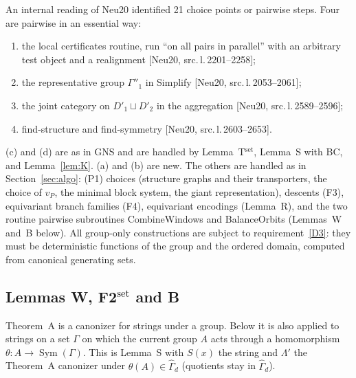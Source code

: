 \documentclass[11pt]{article}
\newenvironment{enumlab}[2][]{\begin{enumerate}\renewcommand{\theenumi}{#1#2{enumi}}%
  \renewcommand{\labelenumi}{(\theenumi)}}{\end{enumerate}}
\theoremstyle{plain}
\theoremstyle{definition}
\theoremstyle{remark}
\theoremstyle{named}
\theoremstyle{namedrm}
\newcommand{\Sym}{\operatorname{Sym}}
\newcommand{\Gd}{\widehat{\Gamma}_d}
\newcommand{\src}[2]{[#1, src.\,l.\,#2]}
\begin{document}
An internal reading of Neu20 identified 21 choice points or pairwise steps. Four are pairwise in an
essential way:
\begin{enumlab}{\alph}
\item the local certificates routine, run ``on all pairs in parallel'' with an arbitrary test object and a
  realignment \src{Neu20}{2201--2258};
\item the representative group $\Gamma''_1$ in Simplify \src{Neu20}{2053--2061};
\item the joint category on $D'_1\sqcup D'_2$ in the aggregation \src{Neu20}{2589--2596};
\item find-structure and find-symmetry \src{Neu20}{2603--2653}.
\end{enumlab}
(c) and (d) are as in GNS and are handled by Lemma~T$^{\text{set}}$, Lemma~S with BC, and Lemma~\ref{lem:K}. (a) and (b)
are new. The others are handled as in Section~\ref{sec:algo}: (P1) choices (structure graphs and their
transporters, the choice of $v_P$, the minimal block system, the giant representation), descents
(F3), equivariant branch families (F4), equivariant encodings (Lemma~R), and the two routine pairwise
subroutines CombineWindows and BalanceOrbits (Lemmas~W and~B below). All group-only constructions are
subject to requirement~\ref{D3}: they must be deterministic functions of the group and the ordered domain,
computed from canonical generating sets.

\subsection{Lemmas W, F2\texorpdfstring{$^{\text{set}}$}{-set} and B}

Theorem~A is a canonizer for strings under a group. Below it is also applied to strings on a set $\Gamma$ on
which the current group $A$ acts through a homomorphism $\theta\colon A\to\Sym(\Gamma)$. This is Lemma~S with
$S(x)$ the string and $\Lambda'$ the Theorem~A canonizer under $\theta(A)\in\Gd$ (quotients stay in $\Gd$).
\end{document}
